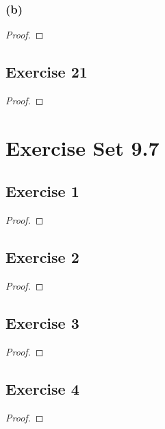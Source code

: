 \documentclass[14pt]{extarticle}
\begin{document}
\subsubsection{(b)}

\begin{proof}

\end{proof}

\subsection{Exercise 21}

\begin{proof}

\end{proof}

\section{Exercise Set 9.7}

\subsection{Exercise 1}

\begin{proof}

\end{proof}

\subsection{Exercise 2}

\begin{proof}

\end{proof}

\subsection{Exercise 3}

\begin{proof}

\end{proof}

\subsection{Exercise 4}

\begin{proof}

\end{proof}
\end{document}

